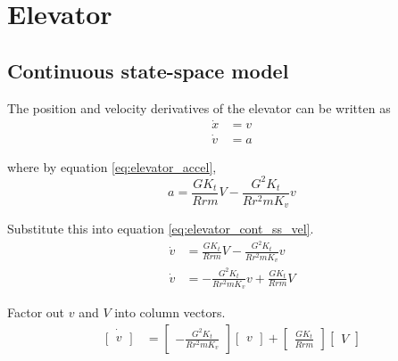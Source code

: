 \section{Elevator}
\label{sec:ss_model_elevator}

\subsection{Continuous state-space model}

The position and velocity derivatives of the elevator can be written as
\begin{align}
  \dot{x} &= v \\
  \dot{v} &= a \label{eq:elevator_cont_ss_vel}
\end{align}

where by equation \eqref{eq:elevator_accel},
\begin{equation*}
  a = \frac{GK_t}{Rrm} V - \frac{G^2 K_t}{Rr^2 m K_v} v
\end{equation*}

Substitute this into equation \eqref{eq:elevator_cont_ss_vel}.
\begin{align}
  \dot{v} &= \frac{GK_t}{Rrm} V - \frac{G^2 K_t}{Rr^2 m K_v} v \nonumber \\
  \dot{v} &= -\frac{G^2 K_t}{Rr^2 m K_v} v + \frac{GK_t}{Rrm} V
\end{align}

Factor out $v$ and $V$ into column vectors.
\begin{align*}
  \dot{\begin{bmatrix}
    v
  \end{bmatrix}} &=
  \begin{bmatrix}
    -\frac{G^2 K_t}{Rr^2 m K_v}
  \end{bmatrix}
  \begin{bmatrix}
    v
  \end{bmatrix} +
  \begin{bmatrix}
    \frac{GK_t}{Rrm}
  \end{bmatrix}
  \begin{bmatrix}
    V
  \end{bmatrix}
\end{align*}

